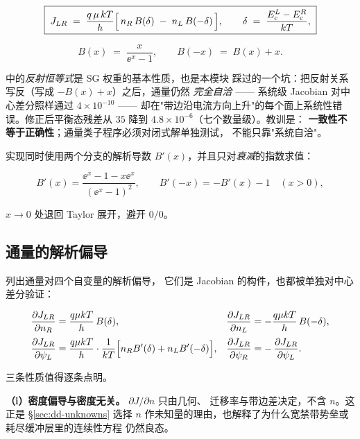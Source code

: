 \begin{equation}
\boxed{\;
J_{LR} \;=\; \frac{q\,\mu\,kT}{h}
\Bigl[\,n_R\,B(\delta) \;-\; n_L\,B(-\delta)\,\Bigr],
\qquad
\delta \;=\; \frac{E_{\mathrm{c}}^{L}-E_{\mathrm{c}}^{R}}{kT},
\;}
\label{eq:sg-flux}
\end{equation}

\begin{equation}
B(x) \;=\; \frac{x}{\ee^{x}-1},
\qquad
B(-x) \;=\; B(x) + x .
\label{eq:bernoulli}
\end{equation}

 中的\emph{反射恒等式}是 SG 权重的基本性质，也是本模块
踩过的一个坑：把反射关系写反（写成 $-B(x)+x$）之后，通量仍然
\emph{完全自洽} —— 系统级 Jacobian 对中心差分照样通过 $4\times10^{-10}$ ——
却在"带边沿电流方向上升"的每个面上系统性错误。修正后平衡态残差从 $35$
降到 $4.8\times10^{-6}$（七个数量级）。教训是：
\textbf{一致性不等于正确性}；通量类子程序必须对闭式解单独测试，
不能只靠"系统自洽"。

实现同时使用两个分支的解析导数 $B'(x)$，并且只对\emph{衰减}的指数求值：

\begin{equation}
B'(x) = \frac{\ee^{x}-1-x\ee^{x}}{(\ee^{x}-1)^{2}},
\qquad
B'(-x) = -B'(x)-1 \quad (x>0),
\label{eq:bernoulli-slope}
\end{equation}

$x\to0$ 处退回 Taylor 展开，避开 $0/0$。

\subsection{通量的解析偏导}
\label{sec:dd-flux-partials}

 列出通量对四个自变量的解析偏导，
它们是 Jacobian 的构件，也都被单独对中心差分验证：

\begin{equation}
\begin{aligned}
\frac{\partial J_{LR}}{\partial n_R} &= \frac{q\mu kT}{h}\,B(\delta), &
\frac{\partial J_{LR}}{\partial n_L} &= -\frac{q\mu kT}{h}\,B(-\delta),\\[2pt]
\frac{\partial J_{LR}}{\partial \psi_L} &= \frac{q\mu kT}{h}\cdot\frac{1}{kT}
  \Bigl[n_R B'(\delta) + n_L B'(-\delta)\Bigr], &
\frac{\partial J_{LR}}{\partial \psi_R} &= -\,\frac{\partial J_{LR}}{\partial \psi_L}.
\end{aligned}
\label{eq:dd-flux-partials}
\end{equation}

三条性质值得逐条点明。

\textbf{（i）密度偏导与密度无关。} $\partial J/\partial n$ 只由几何、
迁移率与带边差决定，不含 $n$。这正是 \S\ref{sec:dd-unknowns} 选择 $n$
作未知量的理由，也解释了为什么宽禁带势垒或耗尽缓冲层里的连续性方程
仍然良态。

